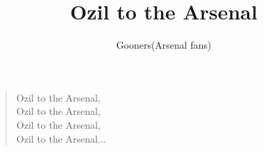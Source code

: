 \documentclass[a4paper,12pt]{article}
\title{Ozil to the Arsenal}
\author{Gooners(Arsenal fans)}
\date{}
\begin{document}
	
	\maketitle
	
	\begin{verse}
		
		Ozil to the Arsenal, \\
		Ozil to the Arsenal, \\
		Ozil to the Arsenal, \\
		Ozil to the Arsenal$\ldots$
		
	\end{verse}
	
\end{document}
